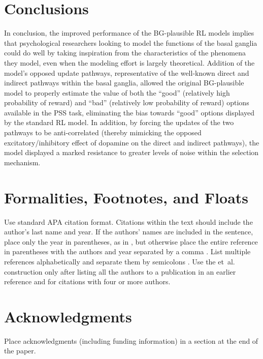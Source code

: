 \documentclass[10pt,letterpaper]{article}
\begin{document}
\section{Conclusions}

In conclusion, the improved performance of the BG-plausible RL models implies that psychological researchers looking to model the functions of the basal ganglia could do well by taking inspiration from the characteristics of the phenomena they model, even when the modeling effort is largely theoretical. Addition of the model’s opposed update pathways, representative of the well-known direct and indirect pathways within the basal ganglia, allowed the original BG-plausible model to properly estimate the value of both the ``good'' (relatively high probability of reward) and ``bad'' (relatively low probability of reward) options available in the PSS task, eliminating the bias towards ``good'' options displayed by the standard RL model. In addition, by forcing the updates of the two pathways to be anti-correlated (thereby mimicking the opposed excitatory/inhibitory effect of dopamine on the direct and indirect pathways), the model displayed a marked resistance to greater levels of noise within the selection mechanism.    



\section{Formalities, Footnotes, and Floats}

Use standard APA citation format. Citations within the text should
include the author's last name and year. If the authors' names are
included in the sentence, place only the year in parentheses, as in
, but otherwise place the entire reference in
parentheses with the authors and year separated by a comma
\cite{NewellSimon1972a}. List multiple references alphabetically and
separate them by semicolons
\cite{ChalnickBillman1988a,NewellSimon1972a}. Use the
et~al. construction only after listing all the authors to a
publication in an earlier reference and for citations with four or
more authors.




\section{Acknowledgments}

Place acknowledgments (including funding information) in a section at
the end of the paper.
\end{document}
